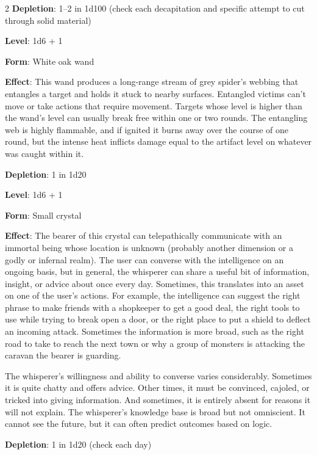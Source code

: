 \begin{multicols}{2}
\textbf{Depletion}: 1–2 in 1d100 (check each decapitation and specific attempt to cut through solid material) 


\textbf{Level}: 1d6 + 1 

\textbf{Form}: White oak wand 

\textbf{Effect}: This wand produces a long-range stream of grey spider’s webbing that entangles a target and holds it stuck to nearby surfaces. Entangled victims can’t move or take actions that require movement. Targets whose level is higher than the wand’s level can usually break free within one or two rounds. The entangling web is highly flammable, and if ignited it burns away over the course of one round, but the intense heat inflicts damage equal to the artifact level on whatever was caught within it. 

\textbf{Depletion}: 1 in 1d20 


\textbf{Level}: 1d6 + 1 

\textbf{Form}: Small crystal 

\textbf{Effect}: The bearer of this crystal can telepathically communicate with an immortal being whose location is unknown (probably another dimension or a godly or infernal realm). The user can converse with the intelligence on an ongoing basis, but in general, the whisperer can share a useful bit of information, insight, or advice about once every day. Sometimes, this translates into an asset on one of the user’s actions. For example, the intelligence can suggest the right phrase to make friends with a shopkeeper to get a good deal, the right tools to use while trying to break open a door, or the right place to put a shield to deflect an incoming attack. Sometimes the information is more broad, such as the right road to take to reach the next town or why a group of monsters is attacking the caravan the bearer is guarding. 

The whisperer’s willingness and ability to converse varies considerably. Sometimes it is quite chatty and offers advice. Other times, it must be convinced, cajoled, or tricked into giving information. And sometimes, it is entirely absent for reasons it will not explain. The whisperer’s knowledge base is broad but not omniscient. It cannot see the future, but it can often predict outcomes based on logic. 

\textbf{Depletion}: 1 in 1d20 (check each day)


\end{multicols}
